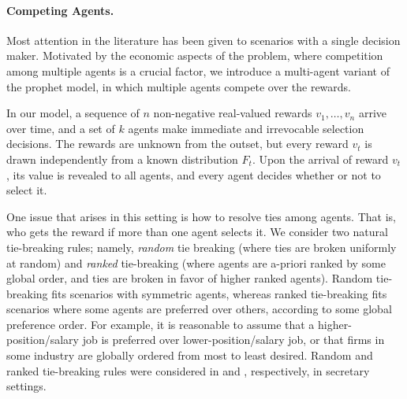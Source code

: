 
\paragraph{Competing Agents.}
Most attention in the literature has been given to scenarios with a single decision maker. 
Motivated by the economic aspects of the problem, where competition among multiple agents is a crucial factor, we introduce a multi-agent variant of the prophet model, in which multiple agents compete over the rewards. 

In our model, a sequence of $n$ non-negative real-valued rewards $v_1, \ldots, v_n$ arrive over time, and a set of $k$ agents make immediate and irrevocable selection decisions. 
The rewards are unknown from the outset, but every reward $v_t$ is drawn independently from a known distribution $F_t$. 
Upon the arrival of reward $v_t$, its value is revealed to all agents, and every agent decides whether or not to select it.

One issue that arises in this setting is how to resolve ties among agents. That is, who gets the reward if more than one agent selects it. We consider two natural tie-breaking rules; namely, {\em random} tie breaking (where ties are broken uniformly at random) and {\em ranked} tie-breaking (where agents are a-priori ranked by some global order, and ties are broken in favor of higher ranked agents). Random tie-breaking fits scenarios with symmetric agents, whereas ranked tie-breaking fits scenarios where some agents are preferred over others, according to some global preference order. For example, it is reasonable to assume that a higher-position/salary job is preferred over lower-position/salary job, or that firms in some industry are globally ordered from most to least desired. 
Random and ranked tie-breaking rules were considered in \citet{immorlica2006secretary} and \citet{karlin2015competitive}, respectively, in secretary settings.

